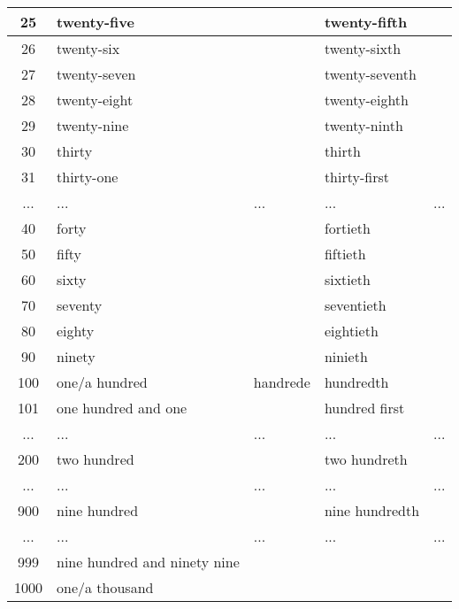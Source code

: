 \begin{center}
\begin{tabular}{ |c|p{3cm}|p{3cm}|p{3cm}|p{3cm}| }
    \hline
    25& 	twenty-five& 	& twenty-fifth& \\
    \hline
    26& 	twenty-six& 	& twenty-sixth& \\
    \hline
    27& 	twenty-seven& 	& twenty-seventh& \\
    \hline
    28& 	twenty-eight& 	& twenty-eighth& \\
    \hline
    29& 	twenty-nine& 	& twenty-ninth& \\
    \hline
    30& 	thirty& 	& thirth& \\
    \hline
    31&         thirty-one&     & thirty-first& \\
    \hline
    ...& ...& ...& ...& ... \\
    \hline
    40&         forty&          & fortieth& \\
    \hline
    50&         fifty&          & fiftieth& \\
    \hline
    60&         sixty&          & sixtieth& \\
    \hline
    70&         seventy&        & seventieth& \\
    \hline
    80&         eighty&         & eightieth& \\
    \hline
    90&         ninety&         & ninieth& \\
    \hline
    100&        one/a hundred& handrede& hundredth& \\
    \hline
    101&        one hundred and one& & hundred first& \\
    \hline
    ...& ...& ...& ...& ... \\
    \hline
    200&        two hundred& & two hundreth& \\
    \hline
    ...& ...& ...& ...& ... \\
    \hline
    900&        nine hundred& & nine hundredth& \\
    \hline
    ...& ...& ...& ...& ... \\
    \hline    
    999&        nine hundred and ninety nine& & & \\
    \hline
    1000&       one/a thousand& & & \\
    \hline
  \end{tabular}
\end{center}

